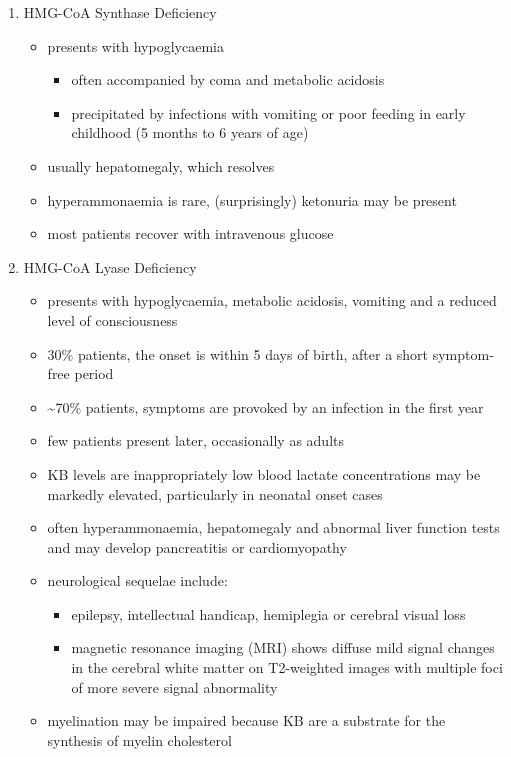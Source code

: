 \documentclass[12pt]{scrartcl}
\begin{document}
\begin{enumerate}
\item HMG-CoA Synthase Deficiency
\label{sec:org6d093a2}
\begin{itemize}
\item presents with hypoglycaemia
\begin{itemize}
\item often accompanied by coma and metabolic acidosis
\item precipitated by infections with vomiting or poor feeding in early
childhood (5 months to 6 years of age)
\end{itemize}
\item usually hepatomegaly, which resolves
\item hyperammonaemia is rare, (surprisingly) ketonuria may be present
\item most patients recover with intravenous glucose
\end{itemize}

\item HMG-CoA Lyase Deficiency
\label{sec:orgef2a3ed}
\begin{itemize}
\item presents with hypoglycaemia, metabolic acidosis, vomiting and a
reduced level of consciousness
\item 30\% patients, the onset is within 5 days of birth, after a short symptom-free period
\item \textasciitilde{}70\% patients, symptoms are provoked by an infection in the first year
\item few patients present later, occasionally as adults
\item KB levels are inappropriately low blood lactate concentrations
may be markedly elevated, particularly in neonatal onset cases
\item often hyperammonaemia, hepatomegaly and abnormal liver function tests and
may develop pancreatitis or cardiomyopathy
\item neurological sequelae include:
\begin{itemize}
\item epilepsy, intellectual handicap, hemiplegia or cerebral visual loss
\item magnetic resonance imaging (MRI) shows diffuse mild signal changes
in the cerebral white matter on T2-weighted images with multiple
foci of more severe signal abnormality
\end{itemize}
\item myelination may be impaired because KB are a substrate for the
synthesis of myelin cholesterol
\end{itemize}
\end{enumerate}
\end{document}
